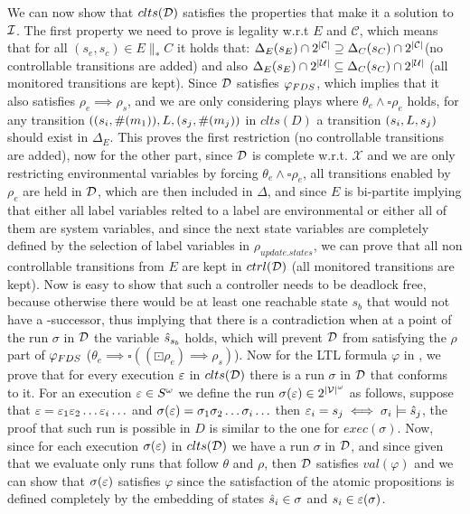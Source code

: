 We can now show that $clts(\mathcal{D})$ satisfies the properties that make it a solution to $\mathcal{I}$. The first property we need to prove is legality w.r.t $E$ and $\mathcal{C}$, which means that for all $(s_e,s_c) \in E \parallel_* C$ it holds that:
$\Delta_{E}(s_E)\cap 2^{|\mathcal{C}|} \supseteq \Delta_{C}(s_C)\cap 2^{|\mathcal{C}|}$(no controllable transitions are added) and also $\Delta_{E}(s_E)\cap 2^{|\mathcal{U}|} \subseteq \Delta_{C}(s_C)\cap 2^{|\mathcal{U}|}$ (all monitored transitions are kept). Since $\mathcal{D}$ satisfies $\varphi_{FDS}$, which implies that it also satisfies $\rho_e \implies \rho_s$, and we are only considering plays where $\theta_e \wedge \square \rho_e$ holds, for any transition $((s_i, \#(m_1)),L,(s_j,\#(m_j))$ in $clts(D)$ a transition $(s_i, L, s_j)$ should exist in $\Delta_E$. This proves the first restriction (no controllable transitions are added), now for the other part, since $\mathcal{D}$ is complete w.r.t. $\mathcal{X}$ and we are only restricting environmental variables by forcing $\theta_e \wedge \square\rho_e$, all transitions enabled by $\rho_e$ are held in $\mathcal{D}$, which are then included in $\Delta$, and since $E$ is bi-partite implying that either all label variables relted to a label are environmental or either all of them are system variables, and since the next state variables are completely defined by the selection of label variables in $\rho_{update.states}$, we can prove that all non controllable transitions from $E$ are kept in $ctrl(\mathcal{D})$ (all monitored transitions are kept). Now is easy to show that such a controller needs to be deadlock free, because otherwise there would be at least one reachable state $s_b$ that would not have a \fdsD-successor, thus implying that there is a contradiction when at a point of the run $\sigma$ in $\mathcal{D}$ the variable $\hat{s}_{s_b}$ holds, which will prevent $\mathcal{D}$ from satisfying the $\rho$ part of $\varphi_{FDS}$ ($\theta_e \implies \square((\boxdot \rho_e) \implies \rho_s)$).  
Now for the LTL formula $\varphi$ in \controlProblem, we prove that for every execution $\varepsilon$ in $clts(\mathcal{D})$ there is a run $\sigma$ in $\mathcal{D}$ that conforms to it.
For an execution $\varepsilon \in S^{\omega}$ we define the run $\sigma(\varepsilon) \in 2^{|\mathcal{V}|^{\omega}}$ as follows, suppose that $\varepsilon= \varepsilon_1 \varepsilon_2 \ldots \varepsilon_i \ldots$ and $\sigma(\varepsilon) = \sigma_1 \sigma_2 \ldots \sigma_i \ldots$ 
 then $\varepsilon_i = s_j \iff \sigma_i \models \hat{s}_{j}$, the proof that such run is possible in $D$ is similar to the one for $exec(\sigma)$.
Now, since for each execution $\sigma(\varepsilon)$ in $clts(\mathcal{D})$ we have a run $\sigma$ in $\mathcal{D}$, and since given that we evaluate only runs that follow $\theta$ and $\rho$, then $\mathcal{D}$ satisfies $val(\varphi)$ and we can show that $\sigma(\varepsilon)$ satisfies $\varphi$ since the satisfaction of the atomic propositions is defined completely by the embedding of states $\hat{s}_{i} \in \sigma$ and $s_i \in \varepsilon(\sigma)$.